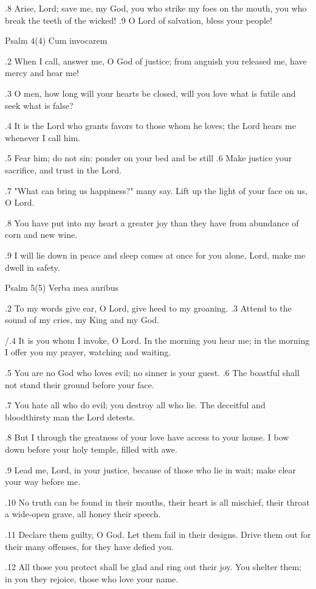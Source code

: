 .8 Arise, Lord; save me, my God,
you who strike my foes on the mouth,
you who break the teeth of the wicked!
.9 O Lord of salvation, bless your people!


Psalm 4(4) Cum invocarem

.2 When I call, answer me, O God of justice;
from anguish you released me, have mercy and hear me!

.3 O men, how long will your hearts be closed,
will you love what is futile and seek what is false?

.4 It is the Lord who grants favors to those whom he loves;
the Lord hears me whenever I call him.

.5 Fear him; do not sin: ponder on your bed and be still
.6 Make justice your sacrifice, and trust in the Lord.

.7 "What can bring us happiness?" many say.
Lift up the light of your face on us, O Lord.

.8 You have put into my heart a greater joy
than they have from abundance of corn and new wine.

.9 I will lie down in peace and sleep comes at once
for you alone, Lord, make me dwell in safety.


Psalm 5(5) Verba mea auribus

.2 To my words give ear, O Lord,
give heed to my groaning.
.3 Attend to the sound of my cries,
my King and my God.

/.4 It is you whom I invoke, O Lord.
In the morning you hear me;
in the morning I offer you my prayer,
watching and waiting.

.5 You are no God who loves evil;
no sinner is your guest.
.6 The boastful shall not stand their ground
before your face.

.7 You hate all who do evil;
you destroy all who lie.
The deceitful and bloodthirsty man
the Lord detests.

.8 But I through the greatness of your love
have access to your house.
I bow down before your holy temple,
filled with awe.

.9 Lead me, Lord, in your justice,
because of those who lie in wait;
make clear your way before me.

.10 No truth can be found in their mouths,
their heart is all mischief,
their throat a wide-open grave,
all honey their speech.

.11 Declare them guilty, O God.
Let them fail in their designs.
Drive them out for their many offenses,
for they have defied you.

.12 All those you protect shall be glad
and ring out their joy.
You shelter them; in you they rejoice,
those who love your name.

